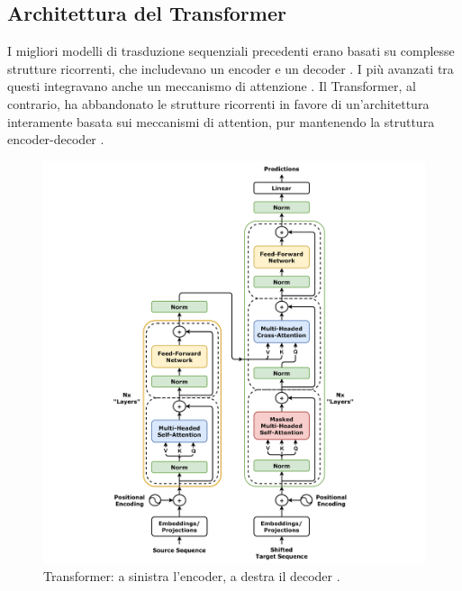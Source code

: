 \subsection{Architettura del Transformer}
I migliori modelli di trasduzione sequenziali precedenti erano basati su complesse strutture ricorrenti, che includevano un encoder e un decoder \cite{cho2014learningphraserepresentationsusing,sutskever2014sequencesequencelearningneural}. I più avanzati tra questi integravano anche un meccanismo di attenzione \cite{vaswani2023attentionneed}. Il Transformer, al contrario, ha abbandonato le strutture ricorrenti in favore di un'architettura interamente basata sui meccanismi di attention, pur mantenendo la struttura encoder-decoder \cite{illustratedtransformer}.
\begin{figure}[!t]
	\centering
	\includegraphics[width=1.05\linewidth]{Images/cap1/Transformer,_full_architecture.png}
	\caption{Transformer: a sinistra l'encoder, a destra il decoder \cite{transformervisuals}.}
	\label{fig:transformer}
\end{figure}

